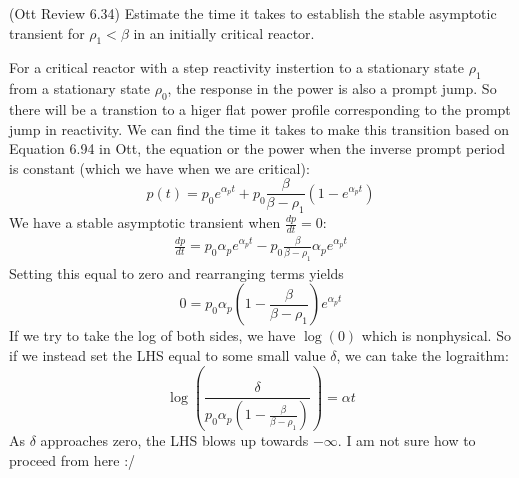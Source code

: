 \documentclass[11pt,addpoints,answers]{exam}
\begin{document}
\begin{questions}
\begin{parts}
        \end{parts}

        \question (Ott Review 6.34) Estimate the time it takes to establish the 
        stable asymptotic transient for $\rho_1 < \beta$ in an initially 
        critical reactor.
                \begin{solution}
                    For a critical reactor with a step reactivity instertion to
                    a stationary state $\rho_{1}$ from a stationary state
                    $\rho_{0}$, the response in the power is also a prompt jump.
                    So there will be a transtion to a higer flat power
                    profile corresponding to the prompt jump in reactivity. We
                    can find the time it takes to make this transition based on
                    Equation 6.94 in Ott, the equation or the power when the
                    inverse prompt period is constant (which we have when we are
                    critical):
                    \begin{equation}
                        p(t) = p_0 e^{\alpha_{p} t} + p_0 \frac{\beta}{\beta -
                        \rho_1} (1 - e^{\alpha_{p} t})
                    \end{equation}
                    We have a stable asymptotic transient when $\frac{dp}{dt} =
                    0$:
                    \begin{align*}
                        \frac{dp}{dt} = p_0 \alpha_p e^{\alpha_p t} - p_0 \frac{\beta}{\beta -
                        \rho_1} \alpha_{p} e^{\alpha_{p} t}
                    \end{align*}
                    Setting this equal to zero and rearranging terms yields
                    \begin{equation}
                        0 = p_0 \alpha_p \left(1 - \frac{\beta}{\beta -
                            \rho_1} \right) e^{\alpha_{p} t}
                    \end{equation}
                    If we try to take the log of both sides, we have $\log(0)$
                    which is nonphysical. So if we instead set the LHS equal to
                    some small value $\delta$, we can take the lograithm:
                    \begin{equation}
                        \log(\frac{\delta}{p_0 \alpha_{p} \left(1 -
                        \frac{\beta}{\beta - \rho_1}\right)}) = \alpha t
                    \end{equation}
                    As $\delta$ approaches zero, the LHS blows up towards
                    $-\infty$. I am not sure how to proceed from here :/
                \end{solution}



\end{questions}
\end{document}
